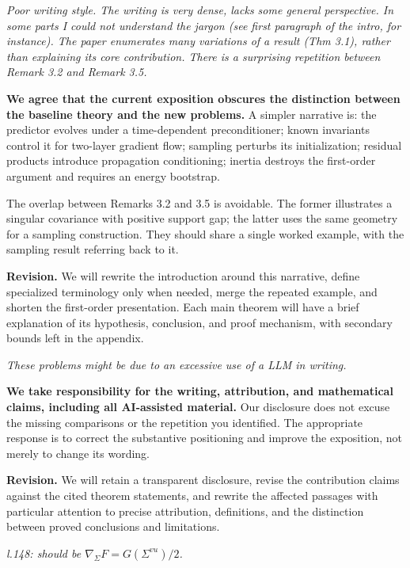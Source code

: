 \documentclass[11pt,a4paper]{article}
\renewenvironment{quote}
  {\par\addvspace{0.8em}\Needspace{8\baselineskip}%
    \list{}{\leftmargin=1.2em\rightmargin=0pt\topsep=0.25em
    \parsep=0.3em}\item\relax\normalsize\itshape\color{quotegray}}
  {\endlist\nopagebreak[4]}
\begin{document}
\begin{quote}
Poor writing style. The writing is very dense, lacks some general perspective. In some parts I could not understand the jargon (see first paragraph of the intro, for instance). The paper enumerates many variations of a result (Thm 3.1), rather than explaining its core contribution. There is a surprising repetition between Remark 3.2 and Remark 3.5.
\end{quote}

\textbf{We agree that the current exposition obscures the distinction between the baseline theory and the new problems.} A simpler narrative is: the predictor evolves under a time-dependent preconditioner; known invariants control it for two-layer gradient flow; sampling perturbs its initialization; residual products introduce propagation conditioning; inertia destroys the first-order argument and requires an energy bootstrap.

The overlap between Remarks 3.2 and 3.5 is avoidable. The former illustrates a singular covariance with positive support gap; the latter uses the same geometry for a sampling construction. They should share a single worked example, with the sampling result referring back to it.

\textbf{Revision.} We will rewrite the introduction around this narrative, define specialized terminology only when needed, merge the repeated example, and shorten the first-order presentation. Each main theorem will have a brief explanation of its hypothesis, conclusion, and proof mechanism, with secondary bounds left in the appendix.

\begin{quote}
These problems might be due to an excessive use of a LLM in writing.
\end{quote}

\textbf{We take responsibility for the writing, attribution, and mathematical claims, including all AI-assisted material.} Our disclosure does not excuse the missing comparisons or the repetition you identified. The appropriate response is to correct the substantive positioning and improve the exposition, not merely to change its wording.

\textbf{Revision.} We will retain a transparent disclosure, revise the contribution claims against the cited theorem statements, and rewrite the affected passages with particular attention to precise attribution, definitions, and the distinction between proved conclusions and limitations.

\begin{quote}
l.148: should be \(\nabla_\Sigma F=G(\Sigma^{vu})/2\).
\end{quote}
\end{document}
